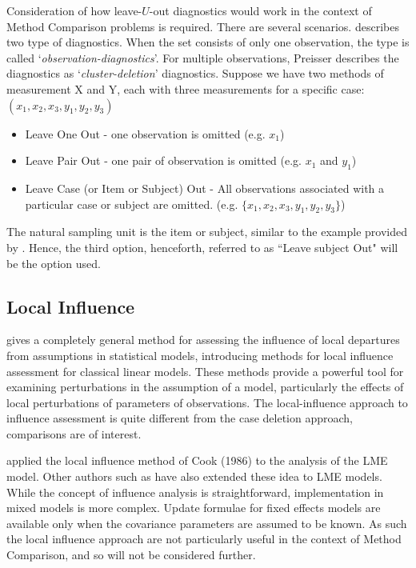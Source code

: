 \documentclass[12pt, a4paper]{report}
\theoremstyle{plain}
\theoremstyle{definition}
\theoremstyle{remark}
\begin{document}
	
	
	
	Consideration of how leave-$U$-out diagnostics would work in the context of Method Comparison problems is required. There are several scenarios. \citet{preisser} describes two type of diagnostics. When the set consists of only one observation, the type is called
	`\textit{observation-diagnostics}'. For multiple observations, Preisser describes the diagnostics as `\textit{cluster-deletion}' diagnostics. Suppose we have two methods of measurement X and Y, each with three measurements for a specific case: $(x_1,x_2,x_3,y_1,y_2,y_3)$
	
	\begin{itemize}
		\item Leave One Out - one observation is omitted (e.g. $x_1$)
		\item Leave Pair Out - one pair of observation  is omitted (e.g. $x_1$ and $y_1$)
		\item Leave Case (or Item or Subject) Out - All observations associated with a particular case or subject are omitted. (e.g. $\{x_1,x_2,x_3,y_1,y_2,y_3\}$)
	\end{itemize}
	
	The natural sampling unit is the item or subject, similar to the example provided by \citet{schabenberger}. Hence, the third option, henceforth, referred to as ``Leave subject Out" will be the option used.
	
	
	\subsection{Local Influence}
	\citet{cook86} gives a completely general method for assessing the influence of local departures from assumptions in statistical models, introducing methods for local influence assessment for classical linear models. These methods provide a powerful tool for examining perturbations in the assumption of a model, particularly the effects of local perturbations of parameters of observations. The local-influence approach to influence assessment is quite different from the case deletion approach, comparisons are of interest.
	
	\citet{Beckman} applied the local influence method of Cook (1986) to the analysis of the LME model.  Other authors such as \citet{lesaffre1998local} have also extended these idea to LME models. 
	While the concept of influence analysis is straightforward, implementation in mixed models is more complex. Update formulae for fixed effects models are available only when the covariance parameters are assumed to be known. As such the local influence approach are not particularly useful in the context of Method Comparison, and so will not be considered further.
	
\end{document}
